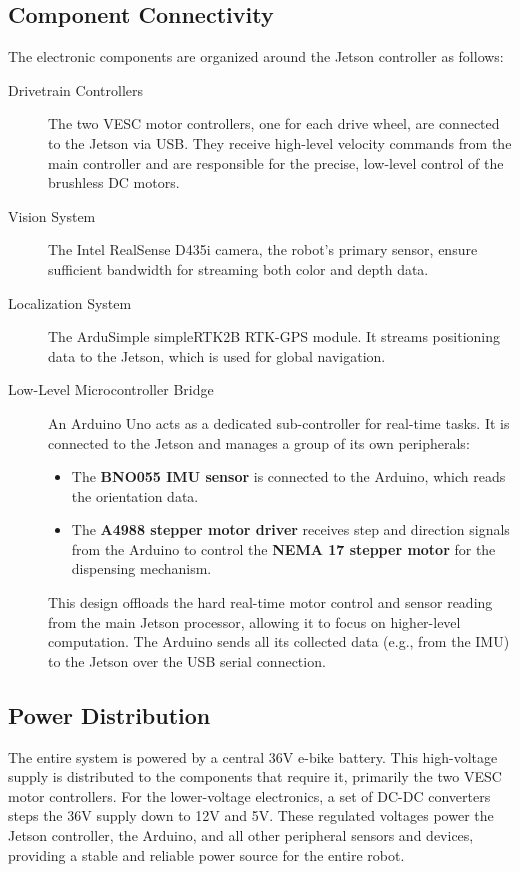 \subsection{Component Connectivity}
The electronic components are organized around the Jetson controller as follows:
\begin{description}
    \item[Drivetrain Controllers] The two VESC motor controllers, one for each drive wheel, are connected to the Jetson via USB. They receive high-level velocity commands from the main controller and are responsible for the precise, low-level control of the brushless DC motors.
    \item[Vision System] The Intel RealSense D435i camera, the robot's primary sensor, ensure sufficient bandwidth for streaming both color and depth data.
    \item[Localization System] The ArduSimple simpleRTK2B RTK-GPS module. It streams positioning data to the Jetson, which is used for global navigation.
    \item[Low-Level Microcontroller Bridge] An Arduino Uno acts as a dedicated sub-controller for real-time tasks. It is connected to the Jetson and manages a group of its own peripherals:
    \begin{itemize}
        \item The \textbf{BNO055 IMU sensor} is connected to the Arduino, which reads the orientation data.
        \item The \textbf{A4988 stepper motor driver} receives step and direction signals from the Arduino to control the \textbf{NEMA 17 stepper motor} for the dispensing mechanism.
    \end{itemize}
    This design offloads the hard real-time motor control and sensor reading from the main Jetson processor, allowing it to focus on higher-level computation. The Arduino sends all its collected data (e.g., from the IMU) to the Jetson over the USB serial connection.
\end{description}

\subsection{Power Distribution}
The entire system is powered by a central 36V e-bike battery. This high-voltage supply is distributed to the components that require it, primarily the two VESC motor controllers. For the lower-voltage electronics, a set of DC-DC converters steps the 36V supply down to 12V and 5V. These regulated voltages power the Jetson controller, the Arduino, and all other peripheral sensors and devices, providing a stable and reliable power source for the entire robot.

